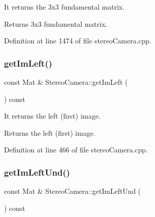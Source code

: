 It returns the 3x3 fundamental matrix. 

\begin{DoxyReturn}{Returns}
3x3 fundamental matrix. 
\end{DoxyReturn}


Definition at line 1474 of file stereo\+Camera.\+cpp.


\begin{DoxyCode}{0}

\end{DoxyCode}
\mbox{\label{classStereoCamera_ac0cb76a6994bd7ab915cb02d83cf8f8e}} 
\subsubsection{\texorpdfstring{getImLeft()}{getImLeft()}}
{\footnotesize\ttfamily const Mat \& Stereo\+Camera\+::get\+Im\+Left (\begin{DoxyParamCaption}{ }\end{DoxyParamCaption}) const}



It returns the left (first) image. 

\begin{DoxyReturn}{Returns}
the left (first) image. 
\end{DoxyReturn}


Definition at line 466 of file stereo\+Camera.\+cpp.


\begin{DoxyCode}{0}

\end{DoxyCode}
\mbox{\label{classStereoCamera_a52ba4f0331f3690ca0f983b10bd0c783}} 
\subsubsection{\texorpdfstring{getImLeftUnd()}{getImLeftUnd()}}
{\footnotesize\ttfamily const Mat \& Stereo\+Camera\+::get\+Im\+Left\+Und (\begin{DoxyParamCaption}{ }\end{DoxyParamCaption}) const}



